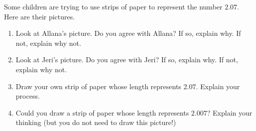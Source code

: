 \documentclass[nooutcomes,noauthor,handout]{ximera}
\begin{document}
\newpage

\begin{problem}
Some children are trying to use strips of paper to represent the number $2.07$.  Here are their pictures.
\begin{image}
\end{image}


\begin{enumerate} 
\item Look at Allana's picture. Do you agree with Allana?  If so, explain why.  If not, explain why not.
\item Look at Jeri's picture. Do you agree with Jeri?  If so, explain why.  If not, explain why not.
\item Draw your own strip of paper whose length represents $2.07$. Explain your process.
\item Could you draw a strip of paper whose length represents $2.007$? Explain your thinking (but you do not need to draw this picture!)
\end{enumerate}
\end{problem}


\newpage
\end{document}
